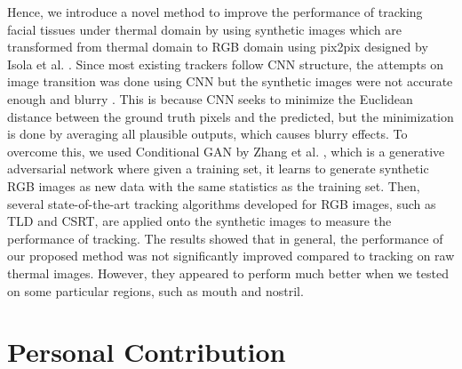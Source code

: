 \documentclass[conference]{IEEEtran}
\begin{document}
Hence, we introduce a novel method to improve the performance of tracking facial tissues under thermal domain by using synthetic images which are transformed from thermal domain to RGB domain using pix2pix designed by Isola et al. \cite{b1}. Since most existing trackers follow CNN structure, the attempts on image transition was done using CNN but the synthetic images were not accurate enough and blurry \cite{b1}. This is because CNN seeks to minimize the Euclidean distance between the ground truth pixels and the predicted, but the minimization is done by averaging all plausible outputs, which causes blurry effects. To overcome this, we used Conditional GAN by Zhang et al. \cite{b5}, which is a generative adversarial network where given a training set, it learns to generate synthetic RGB images as new data with the same statistics as the training set. Then, several state-of-the-art tracking algorithms developed for RGB images, such as TLD \cite{b9} and CSRT\cite{b11}, are applied onto the synthetic images to measure the performance of tracking. The results showed that in general, the performance of our proposed method was not significantly improved compared to tracking on raw thermal images. However, they appeared to perform much better when we tested on some particular regions, such as mouth and nostril.


\section{Personal Contribution}
\end{document}
